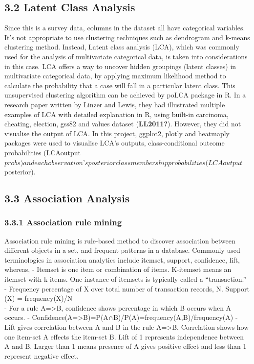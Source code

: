 \documentclass{acm_proc_article-sp}
\begin{document}
\hypertarget{latent-class-analysis}{%
\subsection{3.2 Latent Class Analysis}\label{latent-class-analysis}}

Since this is a survey data, columns in the dataset all have categorical
variables. It's not appropriate to use clustering techniques such as
dendrogram and k-means clustering method. Instead, Latent class analysis
(LCA), which was commonly used for the analysis of multivariate
categorical data, is taken into considerations in this case. LCA offers
a way to uncover hidden groupings (latent classes) in multivariate
categorical data, by applying maximum likelihood method to calculate the
probability that a case will fall in a particular latent class. This
unsupervised clustering algorithm can be achieved by poLCA package in R.
In a research paper written by Linzer and Lewis, they had illustrated
multiple examples of LCA with detailed explanation in R, using built-in
carcinoma, cheating, election, gss82 and values dataset
(\textbf{LL2011?}). However, they did not visualise the output of LCA.
In this project, ggplot2, plotly and heatmaply packages were used to
visualise LCA's outputs, class-conditional outcome probabilities
(LCAoutput\(probs) and each observation’s posterior class membership probabilities (LCAoutput\)posterior).

\hypertarget{association-analysis}{%
\subsection{3.3 Association Analysis}\label{association-analysis}}

\hypertarget{association-rule-mining}{%
\subsubsection{3.3.1 Association rule
mining}\label{association-rule-mining}}

Association rule mining is rule-based method to discover association
between different objects in a set, and frequent patterns in a database.
Commonly used terminologies in association analytics include itemset,
support, confidence, lift, whereas, - Itemset is one item or combination
of items. K-itemset means an itemset with k items. One instance of
itemsets is typically called a ``transaction.'' - Frequency percentage
of X over total number of transaction records, N. Support (X) =
frequency(X)/N\\
- For a rule A=\textgreater B, confidence shows percentage in which B
occurs when A occurs. -
Confidence(A=\textgreater B)=P(A∩B)/P(A)=frequency(A,B)/frequency(A) -
Lift gives correlation between A and B in the rule A=\textgreater B.
Correlation shows how one item-set A effects the item-set B. Lift of 1
represents independence between A and B. Larger than 1 means presence of
A gives positive effect and less than 1 represent negative effect.
\end{document}
